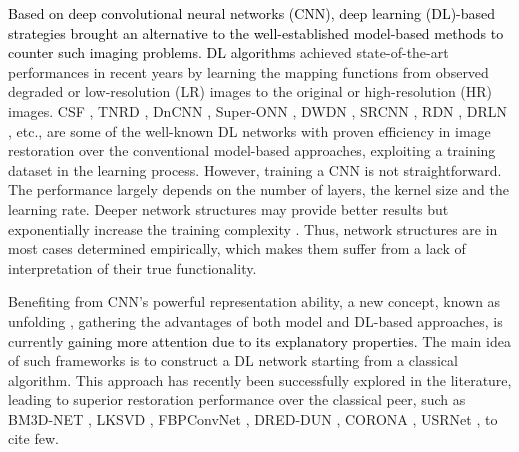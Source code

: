 \documentclass[10pt,journal,compsoc]{IEEEtran}
\newcommand{\sd}{\textcolor{black}}
\newcommand{\dk}{\textcolor{black}}
\begin{document}
\dk{Based on deep convolutional neural networks (CNN), deep learning (DL)-based strategies brought an alternative to the well-established model-based methods to counter such imaging problems.  DL algorithms \cite{vincent2010stacked, Burger2012image, he2016deep, Zhang2018FFDNet, Nan2020variational, Zhang2017learning, Zhang2021residual, Dong2019denoising, Zha2021Triply, Zha2022Low}}
achieved state-of-the-art performances in recent years by learning the mapping functions from observed degraded or low-resolution (LR) images to the original or high-resolution (HR) images. CSF \cite{schmidt2014shrinkage}, TNRD \cite{Chen2017trainable}, DnCNN \cite{Zhang2017beyond}, Super-ONN \cite{malik2021image},
DWDN \cite{Dong2020deep}, SRCNN \cite{Dong2016image}, RDN \cite{Zhang2021residual}, DRLN \cite{Anwar2022densely}, etc., are some of the well-known DL networks with proven efficiency in image restoration over the conventional model-based approaches, exploiting a training dataset in the learning process. However, training a CNN is not straightforward. The performance largely depends on the number of layers, the kernel size and the learning rate. Deeper network structures may provide better results but exponentially increase the training complexity \cite{he2016deep}. Thus, network structures are in most cases determined empirically, which makes them suffer from a lack of interpretation of their true functionality.


Benefiting from CNN's powerful representation ability, a new concept, known as unfolding \cite{Gregor2010learning}, gathering the advantages of both model and DL-based approaches, is currently \sd{gaining more attention
due to its explanatory properties.} The main idea of such frameworks is to construct a DL network starting from a classical algorithm. This approach has recently been successfully explored in the literature, leading to superior restoration performance over the classical peer, such as BM3D-NET \cite{Yang2018bm3dnet}, LKSVD \cite{Scetbon2021deep}, FBPConvNet \cite{Jin2017deep}, DRED-DUN \cite{Kong2022deep}, CORONA \cite{Solomon2020deep}, USRNet \cite{zhang2020deep}, to cite few.



\end{document}

